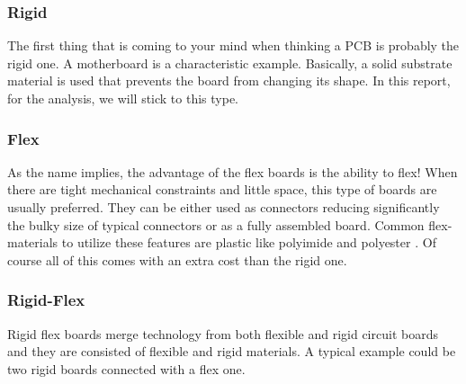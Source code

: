 \documentclass[final]{cubedoc}
\begin{document}
	\subsubsection{Rigid}
	The first thing that is coming to your mind when thinking a PCB is probably the rigid one. A motherboard is a characteristic example. Basically, a solid substrate material is used that prevents the board from changing its shape. In this report, for the analysis, we will stick to this type.
	
	\subsubsection{Flex}
	As the name implies, the advantage of the flex boards is the ability to flex! When there are tight mechanical constraints and little space, this type of boards are usually preferred. They can be either used as connectors reducing significantly the bulky size of typical connectors or as a fully assembled board. Common flex-materials to utilize these features are plastic like polyimide and polyester \cite{altium:flex}. Of course all of this comes with an extra cost than the rigid one.
	
	\subsubsection{Rigid-Flex}
	Rigid flex boards merge technology from both flexible and rigid circuit boards and they are consisted of flexible and rigid materials. A typical example could be two rigid boards connected with a flex one.
	
\end{document}
